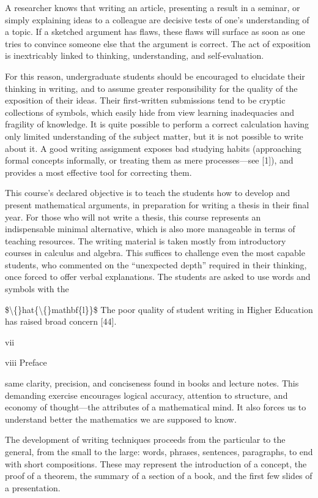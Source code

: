 \documentclass[11pt]{article}
\theoremstyle{plain}
\theoremstyle{definition}
\begin{document}
A researcher knows that writing an article, presenting a result in a seminar, or simply explaining ideas to a colleague are decisive tests of one's understanding of a topic. If a sketched argument has flaws, these flaws will surface as soon as one tries to convince someone else that the argument is correct. The act of exposition is inextricably linked to thinking, understanding, and self-evaluation.

For this reason, undergraduate students should be encouraged to elucidate their thinking in writing, and to assume greater responsibility for the quality of the exposition of their ideas. Their first-written submissions tend to be cryptic collections of symbols, which easily hide from view learning inadequacies and fragility of knowledge. It is quite possible to perform a correct calculation having only limited understanding of the subject matter, but it is not possible to write about it. A good writing assignment exposes bad studying habits (approaching formal concepts informally, or treating them as mere processes---see [1]), and provides a most effective tool for correcting them.

This course's declared objective is to teach the students how to develop and present mathematical arguments, in preparation for writing a thesis in their final year. For those who will not write a thesis, this course represents an indispensable minimal alternative, which is also more manageable in terms of teaching resources. The writing material is taken mostly from introductory courses in calculus and algebra. This suffices to challenge even the most capable students, who commented on the ``unexpected depth'' required in their thinking, once forced to offer verbal explanations. The students are asked to use words and symbols with the

\$\textbackslash\{\}hat\{\textbackslash\{\}mathbf\{l\}\}\$ The poor quality of student writing in Higher Education has raised broad concern [44].

vii

viii Preface

same clarity, precision, and conciseness found in books and lecture notes. This demanding exercise encourages logical accuracy, attention to structure, and economy of thought---the attributes of a mathematical mind. It also forces us to understand better the mathematics we are supposed to know.

The development of writing techniques proceeds from the particular to the general, from the small to the large: words, phrases, sentences, paragraphs, to end with short compositions. These may represent the introduction of a concept, the proof of a theorem, the summary of a section of a book, and the first few slides of a presentation.
\end{document}
